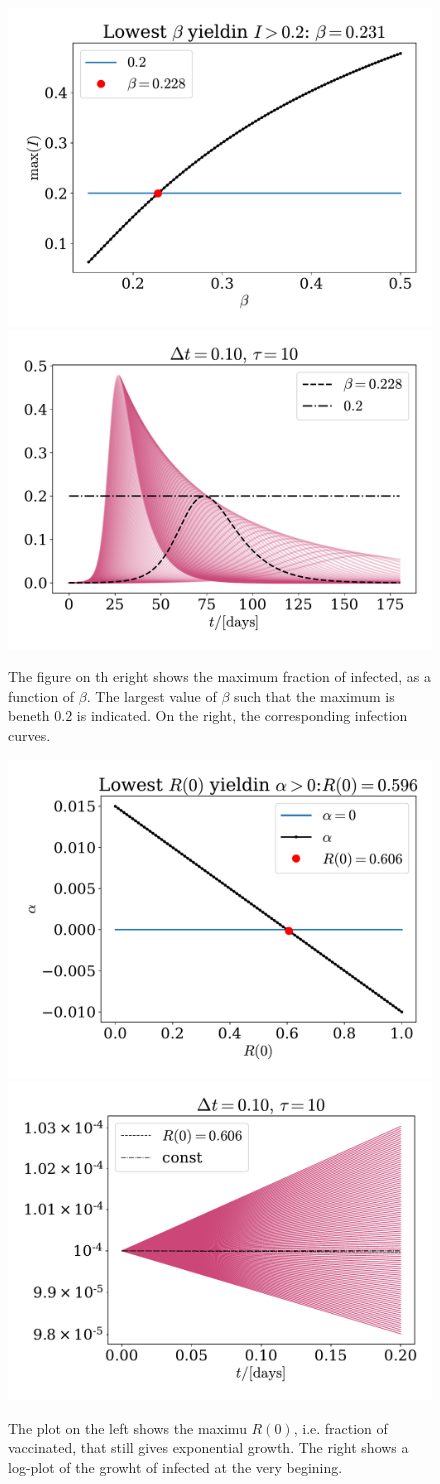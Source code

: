 \documentclass{article}
\begin{document}
    \begin{figure}
        \centering
        \includegraphics[width=.49\textwidth]{../plots/2A/flatten.pdf}
        \includegraphics[width=.49\textwidth]{../plots/2A/flattenIs.pdf}
        \caption{The figure on th eright shows the maximum fraction of infected, as a function of $\beta$. The largest value of $\beta$ such that the maximum is beneth $0.2$ is indicated. On the right, the corresponding infection curves.}
        \label{flattening}
    \end{figure}

    \begin{figure}
        \centering
        \includegraphics[width=.49\textwidth]{../plots/2A/vax.pdf}
        \includegraphics[width=.49\textwidth]{../plots/2A/vax_R.pdf}
        \caption{The plot on the left shows the maximu $R(0)$, i.e. fraction of vaccinated, that still gives exponential growth. The right shows a log-plot of the growht of infected at the very begining.}
        \label{vax}
    \end{figure}
\end{document}
